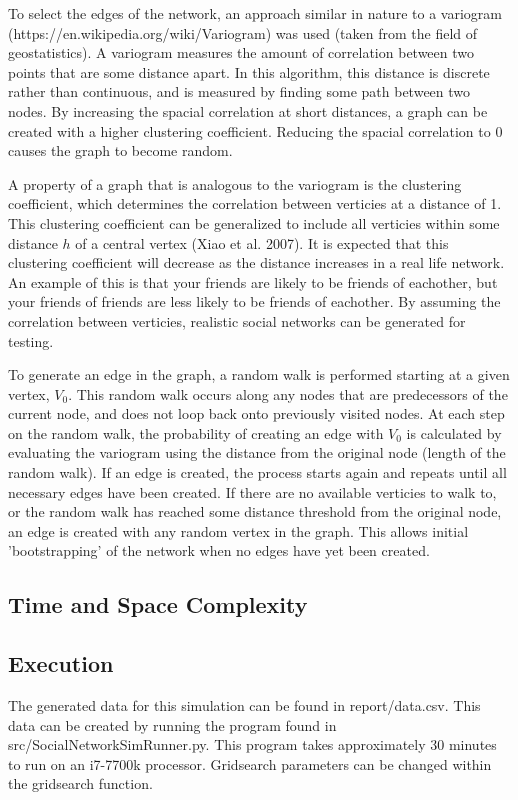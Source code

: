 \documentclass{article}
\begin{document}
To select the edges of the network, an approach similar in nature to a variogram
(https://en.wikipedia.org/wiki/Variogram) was used (taken from the field of geostatistics).
A variogram measures the amount of correlation between two points that are some distance apart.
In this algorithm, this distance is discrete rather than continuous, and is measured by finding
some path between two nodes. By increasing the spacial correlation at short distances,
a graph can be created with a higher clustering coefficient. Reducing the spacial correlation
to 0 causes the graph to become random.

A property of a graph that is analogous to the variogram is the clustering
coefficient, which determines the correlation between verticies at a distance of 1.
This clustering coefficient can be generalized to include all verticies
within some distance $h$ of a central vertex (Xiao et al. 2007).
It is expected that this clustering coefficient will decrease as the distance increases
in a real life network. An example of this is that your friends are likely to be friends of
eachother, but your friends of friends are less likely to be friends of eachother.
By assuming the correlation between verticies, realistic social networks can be generated
for testing.

To generate an edge in the graph, a random walk is performed starting at a given vertex, $V_0$.
This random walk occurs along any nodes that are predecessors of the current node,
and does not loop back onto previously visited nodes.
At each step on the random walk, the probability of creating an edge with $V_0$
is calculated by evaluating the variogram using the distance from the original node
(length of the random walk).
If an edge is created, the process
starts again and repeats until all necessary edges have been created.
If there are no available verticies to walk to,
or the random walk has reached some distance threshold from the original node,
an edge is created with any random vertex in the graph. This allows initial
'bootstrapping' of the network when no edges have yet been created.

\subsection{Time and Space Complexity}



\subsection{Execution}
The generated data for this simulation can be found in report/data.csv.
This data can be created by running the program found in src/SocialNetworkSimRunner.py.
This program takes approximately 30 minutes to run on an i7-7700k processor.
Gridsearch parameters can be changed within the gridsearch function.
\end{document}
